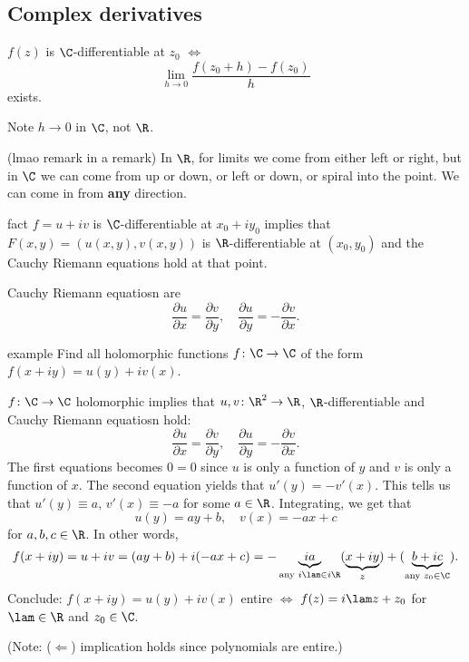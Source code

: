 \documentclass[class=article, crop=false]{standalone}
\begin{document}
\subsection*{Complex derivatives}

$f(z)$ is $\C$-differentiable at $z_0$ $\iff$
  \[
    \lim_{h\to 0}\frac{f(z_0+h)-f(z_0)}{h}
  \]
exists.
\begin{rem}
  Note $h \to 0$ in $\C$, not $\R$.

  \begin{rem}
    (lmao remark in a remark) In $\R$, for limits we come from either left or right, but in $\C$ we can come from up or down, or left or down, or spiral into the point. We can come in from \textbf{any} direction.
  \end{rem}
\end{rem}

\begin{result}{fact}
  $f = u+iv$ is $\C$-differentiable at $x_0 + iy_0$ implies that $F(x,y) = (u(x,y),v(x,y))$ is $\R$-differentiable at $(x_0,y_0)$ and the Cauchy Riemann equations hold at that point.
\end{result}
\begin{rem}
  Cauchy Riemann equatiosn are
    \[
      \frac{\partial u}{\partial x} = \frac{\partial v}{\partial y}, \quad \frac{\partial u}{\partial y} = - \frac{\partial v}{\partial x}.
    \]
\end{rem}

\begin{understandingcheck}{example}
  Find all holomorphic functions $f\colon \C \to \C$ of the form $f(x+iy) = u(y) + i v(x)$.
    \begin{pf}
      $f\colon \C \to \C$ holomorphic implies that $u,v\colon \R^2 \to \R$, $\R$-differentiable and Cauchy Riemann equatiosn hold:
        \[
          \frac{\partial u}{\partial x} = \frac{\partial v}{\partial y}, \quad \frac{\partial u}{\partial y} = - \frac{\partial v}{\partial x}.
        \]
      The first equations becomes $0=0$ since $u$ is only a function of $y$ and $v$ is only a function of $x$. The second equation yields that $u'(y) = -v'(x)$. This tells us that $u'(y)\equiv a$, $v'(x) \equiv -a$ for some $a \in \R$. Integrating, we get that
        \[
          u(y) = ay+b, \quad v(x)=-ax+c
        \]
      for $a,b,c \in \R$. In other words,
        \[
          f(x+iy) = u+iv = (ay+b)+i(-ax+c) = -\underbrace{ia}_{\text{any } i \lam \in i \R}(\underbrace{x+iy}_{z})+(\underbrace{b+ic}_{\text{any } z_0 \in \C}).
        \]
      Conclude: $f(x+iy)= u(y) + iv(x)$ entire $\iff$ $f(z) = i\lam z + z_0$ for $\lam \in \R$ and $z_0 \in \C$.

      (Note: ($\Leftarrow$) implication holds since polynomials are entire.)
    \end{pf}
\end{understandingcheck}
\end{document}
